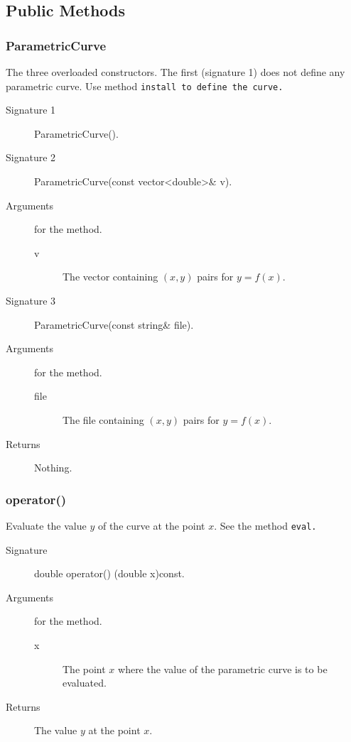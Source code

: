 \subsection{Public Methods}
\subsubsection{ParametricCurve}
The three overloaded constructors. The first (signature 1) does not define
any parametric curve. Use method \tt install \rm  to define
the curve. 
 
\begin{description}
    \item [Signature 1] ParametricCurve().
    \item [Signature 2] ParametricCurve(const vector<double>\& v).
    \item [Arguments] for the method.
	\begin{description}
           \item [v] The vector containing $(x,y)$ pairs for $y =
    f(x)$. 
        \end{description}
     \item [Signature 3] ParametricCurve(const string\& file).
    \item [Arguments] for the method.
       \begin{description}
           \item [file] The file containing $(x,y)$ pairs for $y =
    f(x)$. 
         \end{description} 
    \item [Returns] Nothing.
\end{description} 

\subsubsection{operator()}
Evaluate the value $y$ of the curve at the point $x$. 
See the method \tt eval\rm.
\begin{description}
   \item [Signature] double  operator() (double x)const.
   \item [Arguments] for the method.
     \begin{description}
        \item [x] The point $x$ where the value of the parametric curve 
                  is to be evaluated.
       \end{description}
    \item [Returns] The value $y$ at the point $x$.
\end{description} 

